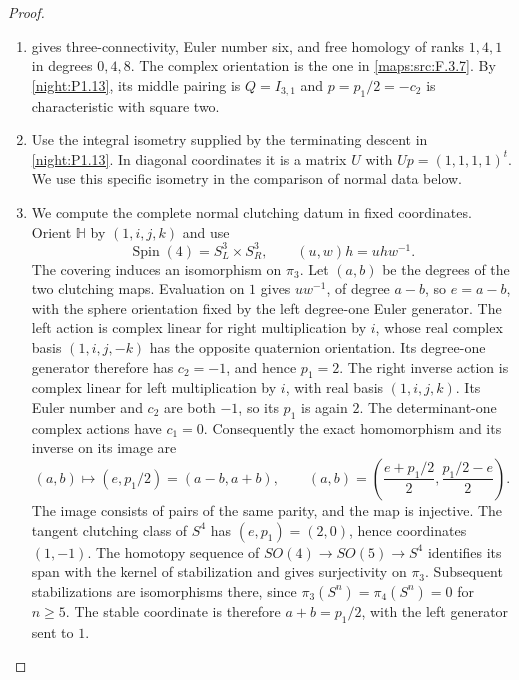 \documentclass[11pt,a4paper]{article}
\numberwithin{equation}{section}
\theoremstyle{definition}
\begin{document}
\begin{proof}
\begin{enumerate}[label=\arabic*.]
\item {} gives three-connectivity,
Euler number six, and free homology of ranks $1,4,1$ in degrees
$0,4,8$. The complex orientation is the one in
\cref{maps:src:F.3.7}. By \cref{night:P1.13}, its middle pairing
is $Q=I_{3,1}$ and $p=p_1/2=-c_2$ is characteristic with square two.

\item Use the integral isometry supplied by the terminating descent
in \cref{night:P1.13}. In diagonal coordinates it is a matrix $U$
with $Up=(1,1,1,1)^t$. We use this specific isometry in the
comparison of normal data below.

\item We compute the complete normal clutching datum in fixed
coordinates. Orient $\mathbb H$ by $(1,i,j,k)$ and use
\[
\operatorname{Spin}(4)=S^3_L\times S^3_R,
\qquad (u,w)h=uhw^{-1}.
\]
The covering induces an isomorphism on $\pi_3$. Let $(a,b)$ be
the degrees of the two clutching maps. Evaluation on $1$ gives
$uw^{-1}$, of degree $a-b$, so $e=a-b$, with the sphere orientation
fixed by the left degree-one Euler generator. The left action is
complex linear for right multiplication by $i$, whose real complex
basis $(1,i,j,-k)$ has the opposite quaternion orientation. Its
degree-one generator therefore has $c_2=-1$, and hence $p_1=2$.
The right inverse action is complex linear for left multiplication
by $i$, with real basis $(1,i,j,k)$. Its Euler number and $c_2$ are
both $-1$, so its $p_1$ is again $2$. The determinant-one complex
actions have $c_1=0$. Consequently the exact homomorphism and its
inverse on its image are
\[
(a,b)\longmapsto(e,p_1/2)=(a-b,a+b),
\qquad
(a,b)=\left(\frac{e+p_1/2}{2},\frac{p_1/2-e}{2}\right).
\]
The image consists of pairs of the same parity, and the map is
injective. The tangent clutching class of $S^4$ has $(e,p_1)=(2,0)$,
hence coordinates $(1,-1)$. The homotopy sequence of
$SO(4)\to SO(5)\to S^4$ identifies its span with the kernel of
stabilization and gives surjectivity on $\pi_3$. Subsequent
stabilizations are isomorphisms there, since
$\pi_3(S^n)=\pi_4(S^n)=0$ for $n\geq5$.
The stable coordinate is therefore $a+b=p_1/2$, with the left
generator sent to $1$.


\end{enumerate}
\end{proof}
\end{document}
